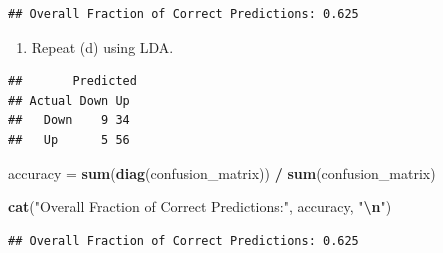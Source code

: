 \documentclass[
]{article}
\newenvironment{Shaded}{\begin{snugshade}}{\end{snugshade}}
\newcommand{\AttributeTok}[1]{\textcolor[rgb]{0.13,0.29,0.53}{#1}}
\newcommand{\FunctionTok}[1]{\textcolor[rgb]{0.13,0.29,0.53}{\textbf{#1}}}
\newcommand{\NormalTok}[1]{#1}
\newcommand{\OtherTok}[1]{\textcolor[rgb]{0.56,0.35,0.01}{#1}}
\newcommand{\SpecialCharTok}[1]{\textcolor[rgb]{0.81,0.36,0.00}{\textbf{#1}}}
\newcommand{\StringTok}[1]{\textcolor[rgb]{0.31,0.60,0.02}{#1}}
\providecommand{\tightlist}{%
  \setlength{\itemsep}{0pt}\setlength{\parskip}{0pt}}
\begin{document}
\begin{verbatim}
## Overall Fraction of Correct Predictions: 0.625
\end{verbatim}

\begin{enumerate}
\def\labelenumi{(\alph{enumi})}
\setcounter{enumi}{4}
\tightlist
\item
  Repeat (d) using LDA.
\end{enumerate}

\begin{Shaded}
\end{Shaded}

\begin{verbatim}
##       Predicted
## Actual Down Up
##   Down    9 34
##   Up      5 56
\end{verbatim}

\begin{Shaded}
\begin{Highlighting}[]
\NormalTok{accuracy }\OtherTok{=} \FunctionTok{sum}\NormalTok{(}\FunctionTok{diag}\NormalTok{(confusion\_matrix)) }\SpecialCharTok{/} \FunctionTok{sum}\NormalTok{(confusion\_matrix)}

\FunctionTok{cat}\NormalTok{(}\StringTok{"Overall Fraction of Correct Predictions:"}\NormalTok{, accuracy, }\StringTok{"}\SpecialCharTok{\textbackslash{}n}\StringTok{"}\NormalTok{)}
\end{Highlighting}
\end{Shaded}

\begin{verbatim}
## Overall Fraction of Correct Predictions: 0.625
\end{verbatim}
\end{document}
